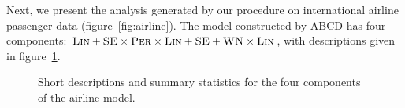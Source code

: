 \documentclass[letterpaper]{article}
\newcommand{\procedurename}{ABCD}
\begin{document}
Next, we present the analysis generated by our procedure on international airline passenger data (figure~\ref{fig:airline}).
The model constructed by \procedurename{} has four components: ${\textsc{Lin}} + {\textsc{SE}} \times {\textsc{Per}} \times {\textsc{Lin}} + {\textsc{SE}} + {\textsc{WN}} \times {\textsc{Lin}}$, with descriptions given in figure~\ref{fig:exec-airline}.

\begin{figure}[h]
\centering
{}
\caption{
Short descriptions and summary statistics for the four components of the airline model.}
\label{fig:exec-airline}
\end{figure}
\end{document}
